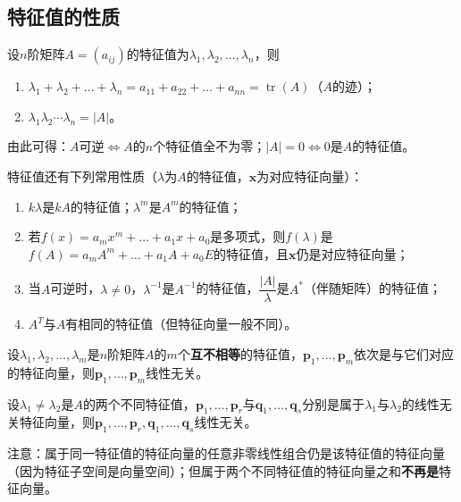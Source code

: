 \subsection{特征值的性质}
设$n$阶矩阵$A=(a_{ij})$的特征值为$\lambda_1,\lambda_2,\dots,\lambda_n$，则
\begin{enumerate}
    \item $\lambda_1+\lambda_2+\dots+\lambda_n=a_{11}+a_{22}+\dots+a_{nn}=\operatorname{tr}(A)$（$A$的迹）；
    \item $\lambda_1\lambda_2\cdots\lambda_n=|A|$。
\end{enumerate}
由此可得：$A$可逆$\iff$$A$的$n$个特征值全不为零；$|A|=0$$\iff$$0$是$A$的特征值。

特征值还有下列常用性质（$\lambda$为$A$的特征值，$\boldsymbol{x}$为对应特征向量）：
\begin{enumerate}
    \item $k\lambda$是$kA$的特征值；$\lambda^{m}$是$A^{m}$的特征值；
    \item 若$f(x)=a_mx^{m}+\dots+a_1x+a_0$是多项式，则$f(\lambda)$是$f(A)=a_mA^{m}+\dots+a_1A+a_0E$的特征值，且$\boldsymbol{x}$仍是对应特征向量；
    \item 当$A$可逆时，$\lambda\ne0$，$\lambda^{-1}$是$A^{-1}$的特征值，$\dfrac{|A|}{\lambda}$是$A^{*}$（伴随矩阵）的特征值；
    \item $A^{T}$与$A$有相同的特征值（但特征向量一般不同）。
\end{enumerate}

\begin{theorem}[不同特征值的特征向量线性无关]
设$\lambda_1,\lambda_2,\dots,\lambda_m$是$n$阶矩阵$A$的$m$个\textbf{互不相等}的特征值，$\boldsymbol{p}_1,\dots,\boldsymbol{p}_m$依次是与它们对应的特征向量，则$\boldsymbol{p}_1,\dots,\boldsymbol{p}_m$线性无关。
\end{theorem}

\begin{corollary}
设$\lambda_1\ne\lambda_2$是$A$的两个不同特征值，$\boldsymbol{p}_{1},\dots,\boldsymbol{p}_{r}$与$\boldsymbol{q}_{1},\dots,\boldsymbol{q}_{s}$分别是属于$\lambda_1$与$\lambda_2$的线性无关特征向量，则$\boldsymbol{p}_1,\dots,\boldsymbol{p}_r,\boldsymbol{q}_1,\dots,\boldsymbol{q}_s$线性无关。
\end{corollary}

注意：属于同一特征值的特征向量的任意非零线性组合仍是该特征值的特征向量（因为特征子空间是向量空间）；但属于两个不同特征值的特征向量之和\textbf{不再是}特征向量。

